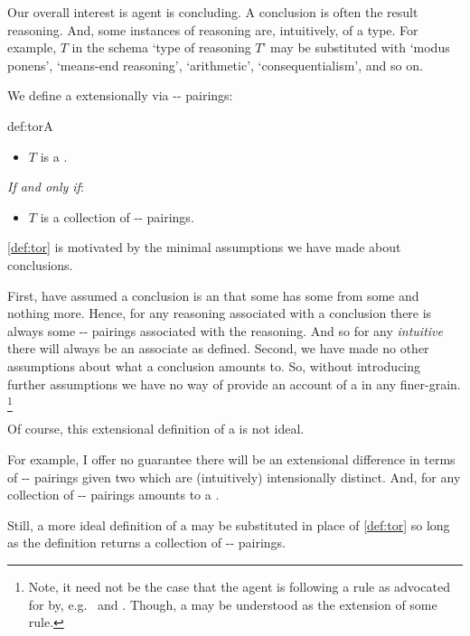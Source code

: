 \begin{note}
  Our overall interest is agent is concluding.
  A conclusion is often the result reasoning.
  And, some instances of reasoning are, intuitively, of a type.
  For example, \(T\) in the schema `type of reasoning \(T\)' may be substituted with `modus ponens', `means-end reasoning', `arithmetic', `consequentialism', and so on.

  We define a  extensionally via -- pairings:

  \begin{rdefinition}{def:tor}{A }
    \mbox{ }
    \vspace{-\baselineskip}
    \begin{itemize}
    \item
      \(T\) is a \torN{}.
    \end{itemize}

    \emph{If and only if}:

    \begin{itemize}
    \item
      \(T\) is a collection of -- pairings.
    \end{itemize}
    \vspace{-\baselineskip}
  \end{rdefinition}

  \noindent%
  \autoref{def:tor} is motivated by the minimal assumptions we have made about conclusions.

  First, have assumed a conclusion is an \eval{} that some  has some  from some  and nothing more.
  Hence, for any reasoning associated with a conclusion there is always some -- pairings associated with the reasoning.
  And so for any \emph{intuitive} \torN{} there will always be an associate \torN{} as defined.
  Second, we have made no other assumptions about what a conclusion amounts to.
  So, without introducing further assumptions we have no way of provide an account of a  in any finer-grain.%
  \footnote{
    Note, it need not be the case that the agent is following a rule as advocated for by, e.g.\ \textcite{Boghossian:2008vf,Boghossian:2012vb} and \textcite{Broome:2002aa,Broome:2013aa}.
    Though, a \torNa{} may be understood as the extension of some rule.
  }
\end{note}


\begin{note}
  Of course, this extensional definition of a  is not ideal.

  For example, I offer no guarantee there will be an extensional difference in terms of -- pairings given two  which are (intuitively) intensionally distinct.
  And, for any collection of -- pairings amounts to a .

  Still, a more ideal definition of a  may be substituted in place of \autoref{def:tor} so long as the definition returns a collection of -- pairings.
\end{note}


